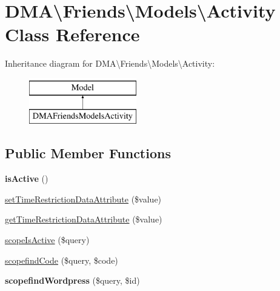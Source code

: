 \hypertarget{classDMA_1_1Friends_1_1Models_1_1Activity}{\section{D\+M\+A\textbackslash{}Friends\textbackslash{}Models\textbackslash{}Activity Class Reference}
\label{classDMA_1_1Friends_1_1Models_1_1Activity}
}
Inheritance diagram for D\+M\+A\textbackslash{}Friends\textbackslash{}Models\textbackslash{}Activity\+:\begin{figure}[H]
\begin{center}
\leavevmode
\includegraphics[height=2.000000cm]{dc/d8c/classDMA_1_1Friends_1_1Models_1_1Activity}
\end{center}
\end{figure}
\subsection*{Public Member Functions}
\begin{DoxyCompactItemize}
\item 
\hypertarget{classDMA_1_1Friends_1_1Models_1_1Activity_aa5a4543ce44bd5b87fee0651c2102daf}{{\bfseries is\+Active} ()}\label{classDMA_1_1Friends_1_1Models_1_1Activity_aa5a4543ce44bd5b87fee0651c2102daf}

\item 
\hyperlink{classDMA_1_1Friends_1_1Models_1_1Activity_ade0ffca24448c217def365d104e52866}{set\+Time\+Restriction\+Data\+Attribute} (\$value)
\item 
\hyperlink{classDMA_1_1Friends_1_1Models_1_1Activity_a98a904c739aca30f2a26152a481164b6}{get\+Time\+Restriction\+Data\+Attribute} (\$value)
\item 
\hyperlink{classDMA_1_1Friends_1_1Models_1_1Activity_acd3f12824d95be07b5221cdc9d64abf7}{scope\+Is\+Active} (\$query)
\item 
\hyperlink{classDMA_1_1Friends_1_1Models_1_1Activity_a9bb36aab36ff22a29b2a594617dd591c}{scopefind\+Code} (\$query, \$code)
\item 
\hypertarget{classDMA_1_1Friends_1_1Models_1_1Activity_a5a533a3f638f99d1dd0a8e0550def49e}{{\bfseries scopefind\+Wordpress} (\$query, \$id)}\label{classDMA_1_1Friends_1_1Models_1_1Activity_a5a533a3f638f99d1dd0a8e0550def49e}

\end{DoxyCompactItemize}
